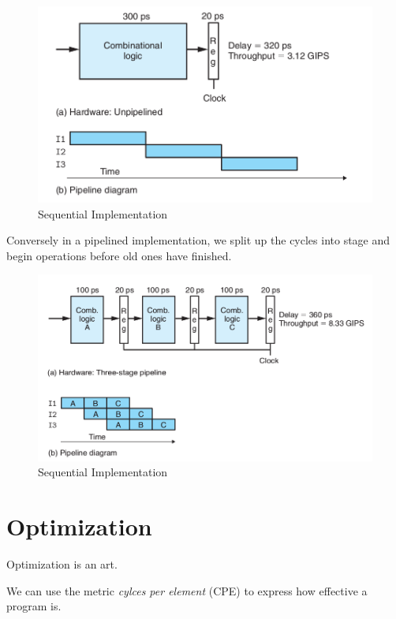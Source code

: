         \begin{figure}[ht]
            \centering
            \includegraphics[scale=0.4]{./img/sequential.png}
            \caption{Sequential Implementation}
        \end{figure}

    Conversely in a pipelined implementation, we split up the cycles into stage and begin operations before old ones have finished.

        \begin{figure}[ht]
            \centering
            \includegraphics[scale=0.4]{./img/pipeline.png}
            \caption{Sequential Implementation}
        \end{figure}

\section{Optimization}
Optimization is an art.

We can use the metric \textit{cylces per element} (CPE) to express how effective a program is.

